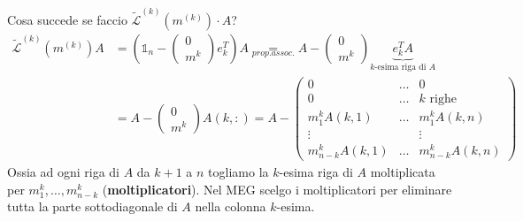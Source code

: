 \documentclass{article}
\begin{document}
Cosa succede se faccio $\widetilde{\mathcal{L}}^{(k)}\left(m^{(k)}\right)\cdot A$?
\begin{align*}
    \widetilde{\mathcal{L}}^{(k)}\left(m^{(k)}\right)A & =\left(\mathbb 1_n-\begin{pmatrix}
                                                                                    0 \\
                                                                                    m^k
                                                                                \end{pmatrix}e^T_k\right)A\underset{prop. assoc.}{=}A-\begin{pmatrix}
                                                                                                                                      0 \\
                                                                                                                                      m^k
                                                                                                                                  \end{pmatrix}\underbrace{e^T_kA}_{k\text{-esima riga di }A} \\
                                                       & =A-\begin{pmatrix}
                                                                0 \\
                                                                m^k
                                                            \end{pmatrix}A(k,:)=A-\begin{pmatrix}
                                                                                      0               & \dots & 0               \\
                                                                                      0               & \dots & k\text{ righe}  \\
                                                                                      m^k_1A(k,1)     & \dots & m^k_1A(k,n)     \\
                                                                                      \vdots          &       & \vdots          \\
                                                                                      m^k_{n-k}A(k,1) & \dots & m^k_{n-k}A(k,n)
                                                                                  \end{pmatrix}
\end{align*}
Ossia ad ogni riga di $A$ da $k+1$ a $n$ togliamo la $k$-esima riga di $A$ moltiplicata per $m_1^k,\dots,m^k_{n-k}$ (\textbf{moltiplicatori}).
Nel MEG scelgo i moltiplicatori per eliminare tutta la parte sottodiagonale di $A$ nella colonna $k$-esima.
\end{document}
